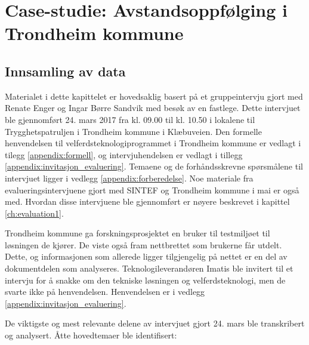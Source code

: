 \chapter{Case-studie: Avstandsoppfølging i Trondheim kommune}
\label{ch:case}

\section{Innsamling av data}
Materialet i dette kapittelet er hovedsaklig basert på et gruppeintervju gjort med Renate Enger og Ingar Børre Sandvik med besøk
av en fastlege. Dette intervjuet ble gjennomført 24. mars 2017 fra kl. 09.00 til kl. 10.50 i lokalene til Trygghetspatruljen i
Trondheim kommune i Klæbuveien. Den formelle henvendelsen til velferdsteknologiprogrammet i Trondheim kommune er vedlagt i
tilegg \ref{appendix:formell}, og intervjuhendelsen er vedlagt i tillegg \ref{appendix:invitasjon_evaluering}. Temaene og
de forhåndsskrevne spørsmålene til intervjuet ligger i vedlegg \ref{appendix:forberedelse}.
Noe materiale fra evalueringsintervjuene gjort med SINTEF og Trondheim kommune i mai er
også med. Hvordan disse intervjuene ble gjennomført er nøyere beskrevet i kapittel \ref{ch:evaluation1}.

Trondheim kommune ga forskningsprosjektet en bruker til testmiljøet til løsningen de kjører. De viste også fram
nettbrettet som brukerne får utdelt. Dette, og informasjonen som allerede ligger tilgjengelig på nettet er en del
av dokumentdelen som analyseres. Teknologileverandøren Imatis ble invitert til et intervju for å snakke om den tekniske
løsningen og velferdsteknologi, men de svarte ikke på henvendelsen. Henvendelsen er i vedlegg \ref{appendix:invitasjon_evaluering}.

De viktigste og mest relevante delene av intervjuet gjort 24. mars ble transkribert og analysert. Åtte hovedtemaer ble identifisert:

